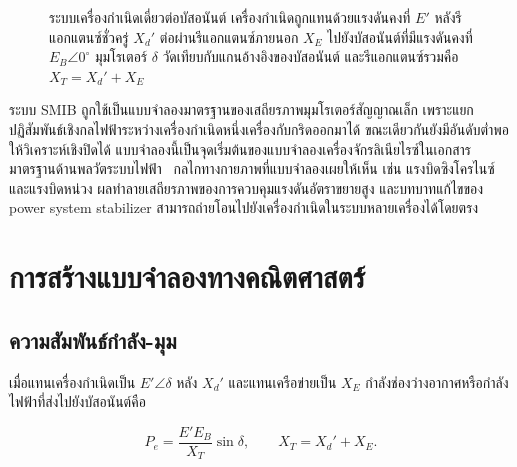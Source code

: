 \documentclass[12pt,a4paper]{article}
\begin{document}
\begin{figure}[H]
\centering
{}
\caption{ระบบเครื่องกำเนิดเดี่ยวต่อบัสอนันต์ เครื่องกำเนิดถูกแทนด้วยแรงดันคงที่
$E'$ หลังรีแอกแตนซ์ชั่วครู่ $X_d'$ ต่อผ่านรีแอกแตนซ์ภายนอก $X_E$
ไปยังบัสอนันต์ที่มีแรงดันคงที่ $E_B\angle 0^\circ$
มุมโรเตอร์ $\delta$ วัดเทียบกับแกนอ้างอิงของบัสอนันต์ และรีแอกแตนซ์รวมคือ
$X_T = X_d' + X_E$}
\label{fig:smib}
\end{figure}

ระบบ SMIB ถูกใช้เป็นแบบจำลองมาตรฐานของเสถียรภาพมุมโรเตอร์สัญญาณเล็ก
เพราะแยกปฏิสัมพันธ์เชิงกลไฟฟ้าระหว่างเครื่องกำเนิดหนึ่งเครื่องกับกริดออกมาได้
ขณะเดียวกันยังมีอันดับต่ำพอให้วิเคราะห์เชิงปิดได้
แบบจำลองนี้เป็นจุดเริ่มต้นของแบบจำลองเครื่องจักรลิเนียไรซ์ในเอกสารมาตรฐานด้านพลวัตระบบไฟฟ้า~\cite{kundur,anderson,sauer}
กลไกทางกายภาพที่แบบจำลองเผยให้เห็น เช่น แรงบิดซิงโครไนซ์และแรงบิดหน่วง
ผลทำลายเสถียรภาพของการควบคุมแรงดันอัตราขยายสูง และบทบาทแก้ไขของ power system stabilizer
สามารถถ่ายโอนไปยังเครื่องกำเนิดในระบบหลายเครื่องได้โดยตรง

\section{การสร้างแบบจำลองทางคณิตศาสตร์}
\label{sec:model}

\subsection{ความสัมพันธ์กำลัง-มุม}

เมื่อแทนเครื่องกำเนิดเป็น $E'\angle\delta$ หลัง $X_d'$ และแทนเครือข่ายเป็น $X_E$
กำลังช่องว่างอากาศหรือกำลังไฟฟ้าที่ส่งไปยังบัสอนันต์คือ

\begin{equation}
P_e = \frac{E' E_B}{X_T}\sin\delta,
\qquad X_T = X_d' + X_E.
\label{eq:Pe}
\end{equation}
\end{document}
